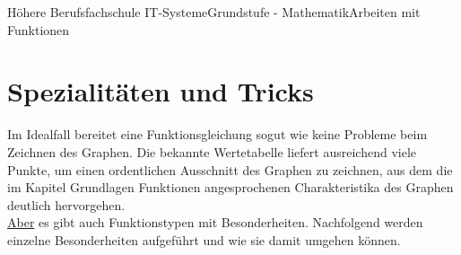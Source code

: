 \documentclass[11pt,twocolumn,oneside,openany,headings=optiontotoc,11pt,numbers=noenddot]{article}
\begin{document}
	\begin{worksheet}{Höhere Berufsfachschule IT-Systeme}{Grundstufe - Mathematik}{Arbeiten mit Funktionen}
		\setcounter{section}{0}
		\section{Spezialitäten und Tricks}
		Im Idealfall bereitet eine Funktionsgleichung sogut wie keine Probleme beim Zeichnen des Graphen. Die bekannte Wertetabelle liefert ausreichend viele Punkte, um einen ordentlichen Ausschnitt des Graphen zu zeichnen, aus dem die im Kapitel \glqq{}Grundlagen Funktionen\grqq{} angesprochenen Charakteristika des Graphen deutlich hervorgehen.\\
		\underline{Aber} es gibt auch Funktionstypen mit Besonderheiten. Nachfolgend werden einzelne Besonderheiten aufgeführt und wie sie damit umgehen können.

\end{worksheet}
\end{document}
